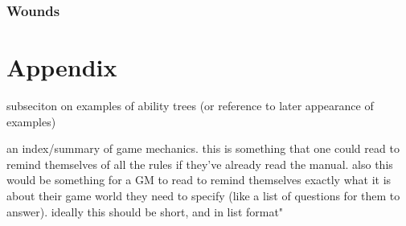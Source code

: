 \documentclass[12pt]{article}
\newcommand{\notes}[1]{{\color{Tan} #1}}
\begin{document}
\subsubsection{Wounds}\label{sec:wounds}

\section{Appendix}


\notes{subseciton on examples of ability trees (or reference to later appearance of examples)}

\notes{an index/summary of game mechanics. this is something that one could read to remind themselves of all the rules
if they've already read the manual. also this would be something for a GM to read to remind themselves
exactly what it is about their game world they need to specify (like a list of questions for them to answer).
ideally this should be short, and in list format"}
\end{document}
